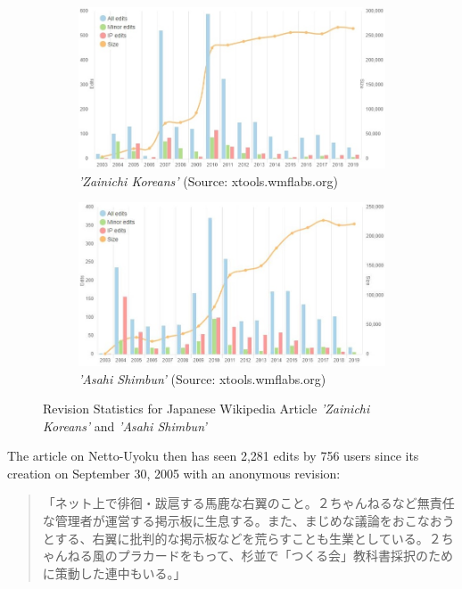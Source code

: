 \documentclass[10pt,british,A4paper,,openany]{memoir}
\begin{document}
\begin{figure}[!htb]
 \centering
 \begin{subfigure}[b]{0.49\textwidth}
  \includegraphics[width=\textwidth]{images/wiki/zainichi.jpg}
  \caption{\textit{'Zainichi Koreans'} (Source: xtools.wmflabs.org)}
  \label{fig:xtools-zainichi}
 \end{subfigure}
  \begin{subfigure}[b]{0.49\textwidth}
  \includegraphics[width=\textwidth]{images/wiki/asahi-shimbun.jpg}
  \caption{\textit{'Asahi Shimbun'} (Source: xtools.wmflabs.org)}
  \label{fig:xtools-asahi}
 \end{subfigure}
 \caption{Revision Statistics for Japanese Wikipedia Article \textit{'Zainichi Koreans'} and \textit{'Asahi Shimbun'}}\label{fig:xtools}
\end{figure}

The article on Netto-Uyoku then has seen 2,281 edits by 756 users since
its creation on September 30, 2005 with an anonymous revision:

\begin{quote}
「ネット上で徘徊・跋扈する馬鹿な右翼のこと。２ちゃんねるなど無責任な管理者が運営する掲示板に生息する。また、まじめな議論をおこなおうとする、右翼に批判的な掲示板などを荒らすことも生業としている。２ちゃんねる風のプラカードをもって、杉並で「つくる会」教科書採択のために策動した連中もいる。」
\end{quote}
\end{document}
